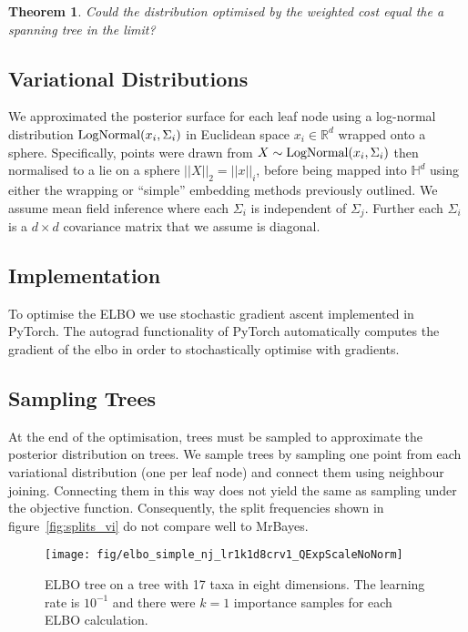 \documentclass[11pt, twocolumn]{article}
\newtheorem{theorem}{Theorem}
\begin{document}
\begin{theorem}
Could the distribution optimised by the weighted cost equal the a spanning tree in the limit?
\end{theorem}

\subsection{Variational Distributions}
We approximated the posterior surface for each leaf node using a log-normal distribution $\textnormal{LogNormal}(x_{i}, \Sigma_{i})$ in Euclidean space $x_{i} \in \mathbb{R}^{d}$ wrapped onto a sphere.
Specifically, points were drawn from $X \sim \textnormal{LogNormal}(x_{i}, \Sigma_{i})$ then normalised to a lie on a sphere $||X||_{2} = ||x||_{i}$, before being mapped into $\mathbb{H}^{d}$ using either the wrapping or ``simple'' embedding methods previously outlined.
We assume mean field inference where each $\Sigma_{i}$ is independent of $\Sigma_{j}$.
Further each $\Sigma_{i}$ is a $d \times d$ covariance matrix that we assume is diagonal.

\subsection{Implementation}
To optimise the ELBO we use stochastic gradient ascent implemented in PyTorch.
The autograd functionality of PyTorch automatically computes the gradient of the elbo in order to stochastically optimise with gradients.

\subsection{Sampling Trees}
At the end of the optimisation, trees must be sampled to approximate the posterior distribution on trees.
We sample trees by sampling one point from each variational distribution (one per leaf node) and connect them using neighbour joining.
Connecting them in this way does not yield the same as sampling under the objective function.
Consequently, the split frequencies shown in figure~\ref{fig:splits_vi} do not compare well to MrBayes.

\begin{figure}[htbp] \label{fig:elbo_trace}
\begin{center}
    \texttt{[image: fig/elbo\_simple\_nj\_lr1k1d8crv1\_QExpScaleNoNorm]}
\end{center}
\caption{ELBO tree on a tree with 17 taxa in eight dimensions. The learning rate is $10^{-1}$ and there were $k=1$ importance samples for each ELBO calculation.}	
\end{figure}
\end{document}
